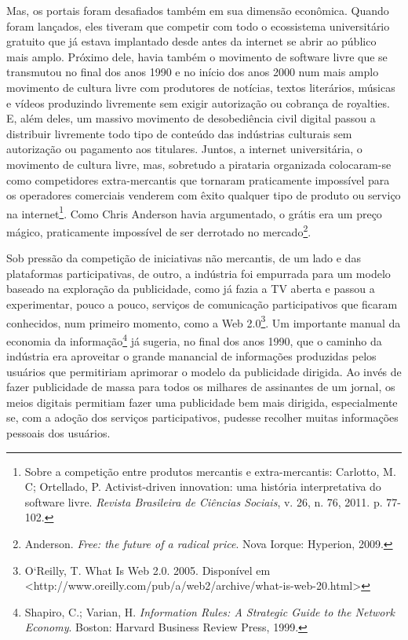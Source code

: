Mas, os portais foram desafiados também em sua dimensão econômica.
Quando foram lançados, eles tiveram que competir com todo o ecossistema
universitário gratuito que já estava implantado desde antes da internet
se abrir ao público mais amplo. Próximo dele, havia também o movimento
de software livre que se transmutou no final dos anos 1990 e no início
dos anos 2000 num mais amplo movimento de cultura livre com produtores
de notícias, textos literários, músicas e vídeos produzindo livremente
sem exigir autorização ou cobrança de royalties. E, além deles, um
massivo movimento de desobediência civil digital passou a distribuir
livremente todo tipo de conteúdo das indústrias culturais sem
autorização ou pagamento aos titulares. Juntos, a internet
universitária, o movimento de cultura livre, mas, sobretudo a pirataria
organizada colocaram-se como competidores extra-mercantis que tornaram
praticamente impossível para os operadores comerciais venderem com êxito
qualquer tipo de produto ou serviço na internet\footnote{Sobre
  a competição entre produtos mercantis e extra-mercantis: Carlotto, M.
  C; Ortellado, P. Activist-driven innovation: uma história
  interpretativa do software livre. \emph{Revista Brasileira de Ciências
  Sociais}, v. 26, n. 76, 2011. p. 77-102.}. Como Chris Anderson havia
argumentado, o grátis era um preço mágico, praticamente impossível de
ser derrotado no mercado\footnote{Anderson. \emph{Free:
  the future of a radical price}. Nova Iorque: Hyperion, 2009.}.

Sob pressão da competição de iniciativas não mercantis, de um lado e das
plataformas participativas, de outro, a indústria foi empurrada para um
modelo baseado na exploração da publicidade, como já fazia a TV aberta e
passou a experimentar, pouco a pouco, serviços de comunicação
participativos que ficaram conhecidos, num primeiro momento, como a Web
2.0\footnote{O`Reilly, T. What Is Web 2.0. 2005.
  Disponível em
  \textless{}http://www.oreilly.com/pub/a/web2/archive/what-is-web-20.html\textgreater{}}.
Um importante manual da economia da informação\footnote{Shapiro,
  C.; Varian, H. \emph{Information Rules: A Strategic Guide to the
  Network Economy}. Boston: Harvard Business Review Press, 1999.} já
sugeria, no final dos anos 1990, que o caminho da indústria era
aproveitar o grande manancial de informações produzidas pelos usuários
que permitiriam aprimorar o modelo da publicidade dirigida. Ao invés de
fazer publicidade de massa para todos os milhares de assinantes de um
jornal, os meios digitais permitiam fazer uma publicidade bem mais
dirigida, especialmente se, com a adoção dos serviços participativos,
pudesse recolher muitas informações pessoais dos usuários.

